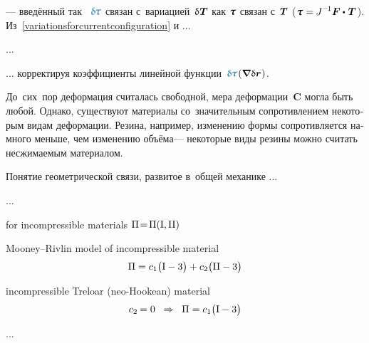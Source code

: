 \begin{otherlanguage}{russian}

\vspace{-0.2em}\noindent
--- введённый так ~${\varbivalent{\hspace{-0.2ex}\cauchystress}}$ связан с~вариацией~$\variation{\hspace{.1ex}\firstpiolakirchhoffstress}$ как $\cauchystress$ связан с~$\bm{T}$ (${\cauchystress = \hspace{-0.1ex} J^{\hspace{.1ex}\expminusone} \bm{F} \dotp \hspace{.15ex} \firstpiolakirchhoffstress\hspace{.2ex}}$). Из~\eqref{variationsforcurrentconfiguration} и ...

...

... корректируя коэффициенты линейной функции~${\varbivalent{\hspace{-0.2ex}\cauchystress}\hspace{.15ex}(\boldnabla \hspace{.1ex} \variation{\currentlocationvector}\hspace{.1ex})}$.

\end{otherlanguage}



\label{para:internalconstraints}

\begin{otherlanguage}{russian}

До~сих~пор деформация считалась свободной, мера деформации~$\bm{C}$ могла быть любой.
Однако, существуют материалы со~значительным сопротивлением некоторым видам деформации.
Резина, например, изменению формы сопротивляется намного меньше, чем изменению объёма\:--- некоторые виды резины можно считать несжимаемым материалом.

Понятие геометрической связи, развитое в~общей механике ...

...

for incompressible materials ${\Pi \hspace{-0.4ex} = \hspace{-0.33ex} \Pi(\mathrm{I}, \mathrm{II})}$

Mooney\hbox{--}Rivlin model of incompressible material
\[
\Pi = c_1 \bigl( \mathrm{I} - 3\bigr) + c_2 \bigl( \mathrm{II} - 3\bigr)
\]

incompressible Treloar (neo-Hookean) material
\[
c_2 \hspace{-0.16ex} = 0
\;\;\Rightarrow\;\;
\Pi = c_1 \bigl( \mathrm{I} - 3\bigr)
\]

...

\end{otherlanguage}

